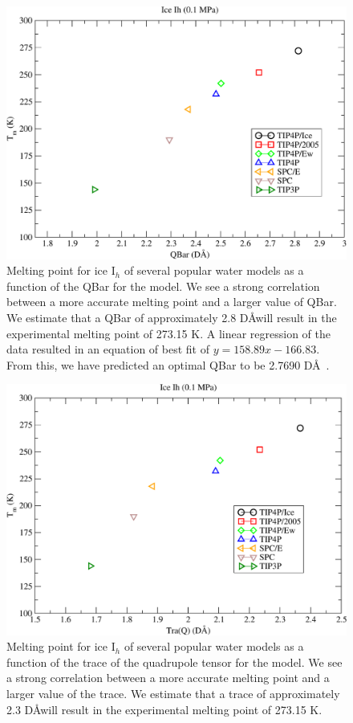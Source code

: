 \begin{figure}[h!]
\includegraphics[width=\linewidth]{Figures/Tm_Ih_Qbar_plot.pdf}
\caption{\label{fig:QBar} Melting point for ice I$_h$ of several popular water models as a function of the QBar for the model. We see a strong correlation between a more accurate melting point and a larger value of QBar. We estimate that a QBar of approximately 2.8 D\AA will result in the experimental melting point of 273.15 K. A linear regression of the data resulted in an equation of best fit of $y = 158.89x - 166.83$. From this, we have predicted an optimal QBar to be 2.7690 D\AA~.}
\end{figure}

\begin{figure}[h!]
\includegraphics[width = \linewidth]{Figures/Tm_Ih_TraQ_plot.pdf}
\caption{\label{fig:TraQ} Melting point for ice I$_h$ of several popular water models as a function of the trace of the quadrupole tensor for the model. We see a strong correlation between a more accurate melting point and a larger value of the trace. We estimate that a trace of approximately 2.3 D\AA will result in the experimental melting point of 273.15 K.}
\end{figure}



